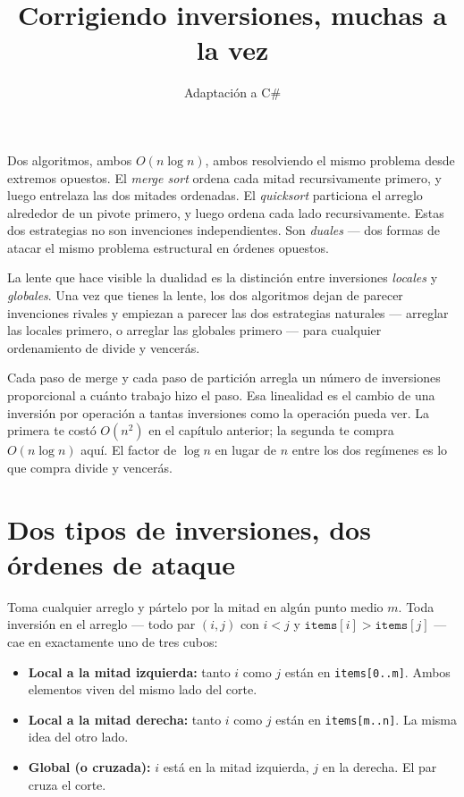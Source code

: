 \documentclass[11pt,a4paper]{article}
\title{Corrigiendo inversiones, muchas a la vez}
\author{Adaptación a C\#}
\date{}
\begin{document}
\maketitle

Dos algoritmos, ambos $O(n \log n)$, ambos resolviendo el mismo problema desde extremos opuestos. El \emph{merge sort} ordena cada mitad recursivamente primero, y luego entrelaza las dos mitades ordenadas. El \emph{quicksort} particiona el arreglo alrededor de un pivote primero, y luego ordena cada lado recursivamente. Estas dos estrategias no son invenciones independientes. Son \emph{duales} --- dos formas de atacar el mismo problema estructural en órdenes opuestos.

La lente que hace visible la dualidad es la distinción entre inversiones \emph{locales} y \emph{globales}. Una vez que tienes la lente, los dos algoritmos dejan de parecer invenciones rivales y empiezan a parecer las dos estrategias naturales --- arreglar las locales primero, o arreglar las globales primero --- para cualquier ordenamiento de divide y vencerás.

Cada paso de merge y cada paso de partición arregla un número de inversiones proporcional a cuánto trabajo hizo el paso. Esa linealidad es el cambio de una inversión por operación a tantas inversiones como la operación pueda ver. La primera te costó $O(n^2)$ en el capítulo anterior; la segunda te compra $O(n \log n)$ aquí. El factor de $\log n$ en lugar de $n$ entre los dos regímenes es lo que compra divide y vencerás.

\section{Dos tipos de inversiones, dos órdenes de ataque}

Toma cualquier arreglo y pártelo por la mitad en algún punto medio $m$. Toda inversión en el arreglo --- todo par $(i, j)$ con $i < j$ y $\texttt{items}[i] > \texttt{items}[j]$ --- cae en exactamente uno de tres cubos:

\begin{itemize}
\item \textbf{Local a la mitad izquierda:} tanto $i$ como $j$ están en \texttt{items[0..m]}. Ambos elementos viven del mismo lado del corte.
\item \textbf{Local a la mitad derecha:} tanto $i$ como $j$ están en \texttt{items[m..n]}. La misma idea del otro lado.
\item \textbf{Global (o cruzada):} $i$ está en la mitad izquierda, $j$ en la derecha. El par cruza el corte.
\end{itemize}
\end{document}
